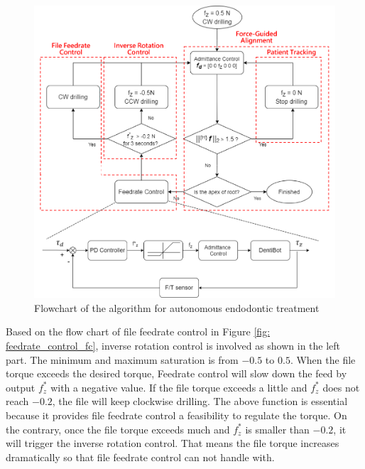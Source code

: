 \begin{figure}[htbp]
\begin{center}
\includegraphics[width=1\linewidth]{Images/algorithm.png}
\end{center}
\caption{
Flowchart of the algorithm for autonomous endodontic treatment
}\label{fig: complete_flowchart}
\end{figure}
Based on the flow chart of file feedrate control in Figure \ref{fig: feedrate_control_fc}, inverse rotation control is involved as shown in the left part. The minimum and maximum saturation is from $-0.5$ to $0.5$. When the file torque exceeds the desired torque, Feedrate control will slow down the feed by output $f^*_z$ with a negative value. If  the file torque exceeds a little and $f^*_z$ does not reach $-0.2$, the file will keep clockwise drilling. The above function is essential because it provides file feedrate control a feasibility to regulate the torque.  On the contrary, once the file torque exceeds much and  $f^*_z$  is smaller than $-0.2$, it will trigger the inverse rotation control. That means the file torque increases dramatically so that file feedrate control can not handle with. 
